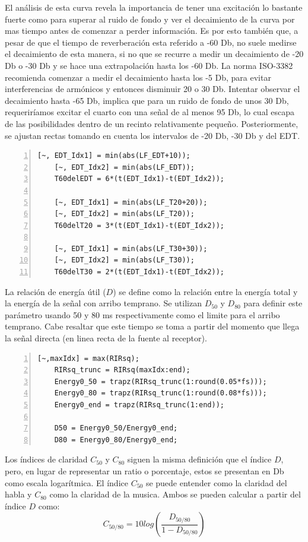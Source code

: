 El análisis de esta curva revela la importancia de tener una excitación lo bastante fuerte como para superar al ruido de fondo y ver el decaimiento de la curva por mas tiempo antes de comenzar a perder información. Es por esto también que, a pesar de que el tiempo de reverberación esta referido a -60 Db, no suele medirse el decaimiento de esta manera, si no que se recurre a medir un decaimiento de -20 Db o -30 Db y se hace una extrapolación hasta los -60 Db. La norma ISO-3382 recomienda comenzar a medir el decaimiento hasta los -5 Db, para evitar interferencias de armónicos y entonces disminuir 20 o 30 Db. Intentar observar el decaimiento hasta -65 Db, implica que para un ruido de fondo de unos 30 Db, requeriríamos excitar el cuarto con una señal de al menos 95 Db, lo cual escapa de las posibilidades dentro de un recinto relativamente pequeño.\hfill\break
Posteriormente, se ajustan rectas tomando en cuenta los intervalos de -20 Db, -30 Db y del EDT.
\begin{lstlisting}[frame=single,numbers=left, style=Matlab-editor, basicstyle=\tiny]
    [~, EDT_Idx1] = min(abs(LF_EDT+10));
    [~, EDT_Idx2] = min(abs(LF_EDT));
    T60delEDT = 6*(t(EDT_Idx1)-t(EDT_Idx2));
    
    [~, EDT_Idx1] = min(abs(LF_T20+20));
    [~, EDT_Idx2] = min(abs(LF_T20));
    T60delT20 = 3*(t(EDT_Idx1)-t(EDT_Idx2));
    
    [~, EDT_Idx1] = min(abs(LF_T30+30));
    [~, EDT_Idx2] = min(abs(LF_T30));
    T60delT30 = 2*(t(EDT_Idx1)-t(EDT_Idx2));
\end{lstlisting}
La relación de energía útil ($D$) se define como la relación entre la energía total y la energía de la señal con arribo temprano. Se utilizan $D_{50}$ y $D_{80}$ para definir este parámetro usando 50 y 80 ms respectivamente como el limite para el arribo temprano. Cabe resaltar que este tiempo se toma a partir del momento que llega la señal directa (en linea recta de la fuente al receptor).
\begin{lstlisting}[frame=single,numbers=left, style=Matlab-editor, basicstyle=\tiny]
    [~,maxIdx] = max(RIRsq);
    RIRsq_trunc = RIRsq(maxIdx:end);
    Energy0_50 = trapz(RIRsq_trunc(1:round(0.05*fs)));
    Energy0_80 = trapz(RIRsq_trunc(1:round(0.08*fs)));
    Energy0_end = trapz(RIRsq_trunc(1:end));
    
    D50 = Energy0_50/Energy0_end;
    D80 = Energy0_80/Energy0_end;
\end{lstlisting}
Los índices de claridad $C_{50}$ y $C_{80}$ siguen la misma definición que el índice $D$, pero, en lugar de representar un ratio o porcentaje, estos se presentan en Db como escala logarítmica. El índice $C_{50}$ se puede entender como la claridad del habla y $C_{80}$ como la claridad de la musica. Ambos se pueden calcular a partir del índice $D$ como:
$$C_{50/80} = 10 log \left( \frac{D_{50/80}}{1-D_{50/80}} \right)$$

